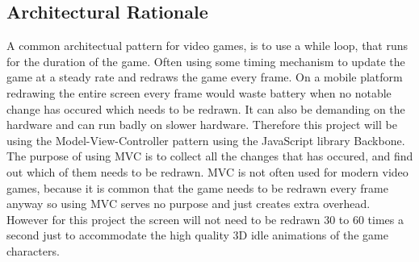 \subsection{Architectural Rationale}

A common architectual pattern for video games, is to use a while loop, that runs for the duration of the game. Often using some timing mechanism to update the game at a steady rate and redraws the game every frame. On a mobile platform redrawing the entire screen every frame would waste battery when no notable change has occured which needs to be redrawn. It can also be demanding on the hardware and can run badly on slower hardware. Therefore this project will be using the Model-View-Controller pattern using the JavaScript library Backbone. The purpose of using MVC is to collect all the changes that has occured, and find out which of them needs to be redrawn. MVC is not often used for modern video games, because it is common that the game needs to be redrawn every frame anyway so using MVC serves no purpose and just creates extra overhead. However for this project the screen will not need to be redrawn 30 to 60 times a second just to accommodate the high quality 3D idle animations of the game characters.
